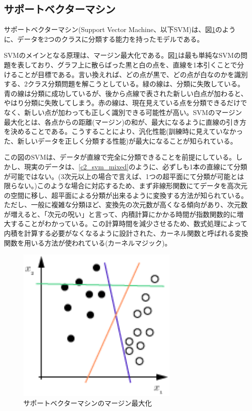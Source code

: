 
\subsection{サポートベクターマシン}
サポートベクターマシン(Support Vector Machine、以下SVM)は、図\ref{c2_svm}のように、データを2つのクラスに分類する能力を持ったモデルである\cite{cortes1995support-vector}。\par
SVMのメインとなる原理は、マージン最大化である。図\ref{c2_svm}は最も単純なSVMの問題を表しており、グラフ上に散らばった黒と白の点を、直線を1本引くことで分けることが目標である。言い換えれば、どの点が黒で、どの点が白なのかを識別する、2クラス分類問題を解こうとしている。緑の線は、分類に失敗している。青の線は分類に成功しているが、後から点線で表された新しい白点が加わると、やはり分類に失敗してしまう。赤の線は、現在見えている点を分類できるだけでなく、新しい点が加わっても正しく識別できる可能性が高い。SVMのマージン最大化とは、各点からの距離(マージン)の和が、最大になるように直線の引き方を決めることである。こうすることにより、汎化性能(訓練時に見えていなかった、新しいデータを正しく分類する性能)が最大になることが知られている。\par
この図のSVMは、データが直線で完全に分類できることを前提にしている。しかし、現実のデータは、\ref{c2_svm_mixed}のように、必ずしも1本の直線にて分類が可能ではない。(3次元以上の場合で言えば、1つの超平面にて分類が可能とは限らない。)このような場合に対応するため、まず非線形関数にてデータを高次元の空間に移し、超平面による分類が出来るように変換する方法が知られている\cite{burges1998a-tutorial}。ただし、一般に複雑な分類ほど、変換先の次元数が高くなる傾向があり、次元数が増えると、「次元の呪い」と言って、内積計算にかかる時間が指数関数的に増大することがわかっている\cite{bellman1961adaptive}。この計算時間を減少させるため、数式処理によって内積を計算する必要がなくなるように設計された、カーネル関数と呼ばれる変換関数を用いる方法が使われている(カーネルマジック)。
\begin{figure}[tbp]
 \centering
  \includegraphics[width=80mm]{img/c2/svm}
 \caption{サポートベクターマシンのマージン最大化}
 \label{c2_svm}
\end{figure}

